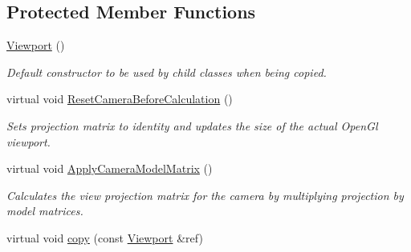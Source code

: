\subsection*{Protected Member Functions}
\begin{DoxyCompactItemize}
\item 
\mbox{\label{class_geometry_engine_1_1_geometry_item_utils_1_1_viewport_abd6d81a5e5d4dd10270a5856cc7dd469}} 
\mbox{\hyperlink{class_geometry_engine_1_1_geometry_item_utils_1_1_viewport_abd6d81a5e5d4dd10270a5856cc7dd469}{Viewport}} ()
\begin{DoxyCompactList}\small\item\em Default constructor to be used by child classes when being copied. \end{DoxyCompactList}\item 
\mbox{\label{class_geometry_engine_1_1_geometry_item_utils_1_1_viewport_a59b1c812e5b06db173c540cade51b158}} 
virtual void \mbox{\hyperlink{class_geometry_engine_1_1_geometry_item_utils_1_1_viewport_a59b1c812e5b06db173c540cade51b158}{Reset\+Camera\+Before\+Calculation}} ()
\begin{DoxyCompactList}\small\item\em Sets projection matrix to identity and updates the size of the actual Open\+Gl viewport. \end{DoxyCompactList}\item 
\mbox{\label{class_geometry_engine_1_1_geometry_item_utils_1_1_viewport_a07cf94a940faa629e5e7a5f6d263c6cf}} 
virtual void \mbox{\hyperlink{class_geometry_engine_1_1_geometry_item_utils_1_1_viewport_a07cf94a940faa629e5e7a5f6d263c6cf}{Apply\+Camera\+Model\+Matrix}} ()
\begin{DoxyCompactList}\small\item\em Calculates the view projection matrix for the camera by multiplying projection by model matrices. \end{DoxyCompactList}\item 
virtual void \mbox{\hyperlink{class_geometry_engine_1_1_geometry_item_utils_1_1_viewport_a2cd0eeeac769d5da977a17a4e394a1d9}{copy}} (const \mbox{\hyperlink{class_geometry_engine_1_1_geometry_item_utils_1_1_viewport}{Viewport}} \&ref)
\end{DoxyCompactItemize}
